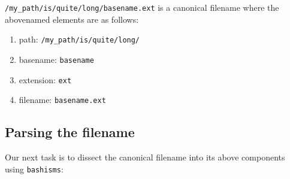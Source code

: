 \documentclass[
  a4paper,
]{article}
\providecommand{\tightlist}{%
  \setlength{\itemsep}{0pt}\setlength{\parskip}{0pt}}
\begin{document}
\texttt{/my\_path/is/quite/long/basename.ext} is a canonical filename
where the abovenamed elements are as follows:

\begin{enumerate}
\tightlist
\item
  path: \texttt{/my\_path/is/quite/long/}
\item
  basename: \texttt{basename}
\item
  extension: \texttt{ext}
\item
  filename: \texttt{basename.ext}
\end{enumerate}

\hypertarget{parsing-the-filename}{%
\subsection{Parsing the filename}\label{parsing-the-filename}}

Our next task is to dissect the canonical filename into its above
components using \texttt{bashisms}:
\end{document}
